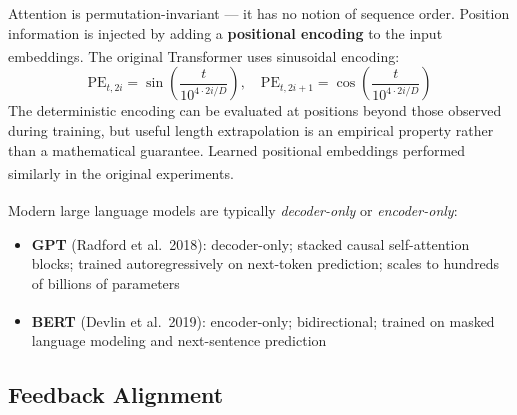 \begin{tcbitemize}[ skin=sectionraster ]
    \tcbitem[title={Positional Encoding}, raster multicolumn=3]
    Attention is permutation-invariant --- it has no notion of sequence order.
    Position information is injected by adding a \textbf{positional encoding} to the input embeddings\textsuperscript{\cite[][pp.~81--82]{fleuretLittleBookDeep}}.
    The original Transformer uses sinusoidal encoding:
    \begin{equation}
        \mathrm{PE}_{t,2i} = \sin\!\left(\frac{t}{10^{4 \cdot 2i/D}}\right),
        \quad
        \mathrm{PE}_{t,2i+1} = \cos\!\left(\frac{t}{10^{4 \cdot 2i/D}}\right)
    \end{equation}
    The deterministic encoding can be evaluated at positions beyond those observed during training, but useful length extrapolation is an empirical property rather than a mathematical guarantee. Learned positional embeddings performed similarly in the original experiments\textsuperscript{\cite[][p.~6]{vaswaniAttentionAllYou2023}}.

    \tcbitem[title={GPT and BERT: Decoder- and Encoder-Only}, raster multicolumn=3]
    Modern large language models are typically \emph{decoder-only} or \emph{encoder-only}\textsuperscript{\cite[][pp.~97--99]{fleuretLittleBookDeep}}:
    \begin{itemize}
        \item \textbf{GPT} (Radford et al.\ 2018): decoder-only; stacked causal self-attention blocks; trained autoregressively on next-token prediction; scales to hundreds of billions of parameters
        \item \textbf{BERT}\textsuperscript{\cite[][]{devlinBERTPretrainingDeep2019}} (Devlin et al.\ 2019): encoder-only; bidirectional; trained on masked language modeling and next-sentence prediction
    \end{itemize}
\end{tcbitemize}

\subsection{Feedback Alignment}

